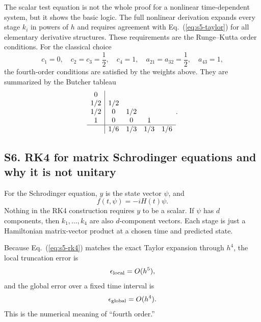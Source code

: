 \documentclass[aps,pra,preprint,superscriptaddress,nofootinbib]{revtex4-2}
\begin{document}
The scalar test equation is not the whole proof for a nonlinear time-dependent system, but it shows the basic logic. The full nonlinear derivation expands every stage \(k_i\) in powers of \(h\) and requires agreement with Eq.~(\ref{eq:s5-taylor}) for all elementary derivative structures. These requirements are the Runge--Kutta order conditions. For the classical choice
\begin{equation}
c_1=0,\quad c_2=c_3=\frac{1}{2},\quad c_4=1,\quad
a_{21}=a_{32}=\frac{1}{2},\quad a_{43}=1,
\end{equation}
the fourth-order conditions are satisfied by the weights above. They are summarized by the Butcher tableau
\begin{equation}
\begin{array}{c|cccc}
0&&&&\\
1/2&1/2&&&\\
1/2&0&1/2&&\\
1&0&0&1&\\
\hline
&1/6&1/3&1/3&1/6
\end{array}.
\end{equation}

\subsection*{S6. RK4 for matrix Schrodinger equations and why it is not unitary}

For the Schrodinger equation, \(y\) is the state vector \(\psi\), and
\begin{equation}
f(t,\psi)=-iH(t)\psi.
\end{equation}
Nothing in the RK4 construction requires \(y\) to be a scalar. If \(\psi\) has \(d\) components, then \(k_1,\ldots,k_4\) are also \(d\)-component vectors. Each stage is just a Hamiltonian matrix-vector product at a chosen time and predicted state.

Because Eq.~(\ref{eq:s5-rk4}) matches the exact Taylor expansion through \(h^4\), the local truncation error is
\begin{equation}
\epsilon_{\rm local}=O(h^5),
\end{equation}
and the global error over a fixed time interval is
\begin{equation}
\epsilon_{\rm global}=O(h^4).
\end{equation}
This is the numerical meaning of ``fourth order.''
\end{document}
